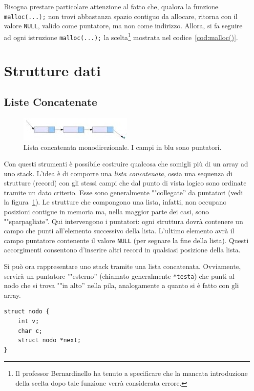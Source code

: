Bisogna prestare particolare attenzione al fatto che, qualora la funzione \lstinline!malloc(...);! non trovi abbastanza spazio contiguo da allocare, ritorna con il valore \lstinline!NULL!,  valido come puntatore, ma non come indirizzo. Allora, si fa seguire ad ogni istruzione \lstinline!malloc(...);! la scelta\footnote{Il professor Bernardinello ha tenuto a specificare che la mancata introduzione della scelta dopo tale funzione verrà considerata errore.} mostrata nel codice~\vref{cod:malloc()}.

	\section{Strutture dati}
		\subsection{Liste Concatenate}
		\label{subsec:liste}
\begin{figure}
	\centering
	\includegraphics[width=0.4\columnwidth]{immagini/lista}
	\caption[Lista concatenata monodirezionale]{Lista concatenata monodirezionale. I campi in blu sono puntatori.}
	\label{fig:mlist}
\end{figure}
Con questi strumenti è possibile costruire qualcosa che somigli più di un array ad uno stack. L'idea è di comporre una \emph{lista concatenata}, ossia una sequenza di strutture (record) con gli stessi campi che dal punto di vista logico sono ordinate tramite un dato criterio. Esse sono generalmente ""collegate'' da puntatori (vedi la figura~\ref{fig:mlist}). Le strutture che compongono una lista, infatti, non occupano posizioni contigue in memoria ma, nella maggior parte dei casi, sono ""sparpagliate''. Qui intervengono i puntatori: ogni struttura dovrà contenere un campo che punti all'elemento successivo della lista. L'ultimo elemento avrà il campo puntatore contenente il valore \lstinline!NULL! (per segnare la fine della lista). Questi accorgimenti consentono d'inserire altri record in qualsiasi posizione della lista.

Si può ora rappresentare uno stack tramite una lista concatenata. Ovviamente, servirà un puntatore ""esterno'' (chiamato generalmente \lstinline!*testa!) che punti al nodo che si trova ""in alto'' nella pila, analogamente a quanto si è fatto con gli array.
\begin{lstlisting}
struct nodo {
	int v;
	char c;
	struct nodo *next;
}
\end{lstlisting}